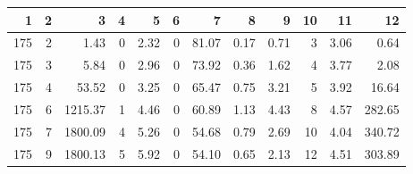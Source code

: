 \begin{tabular}{rrrrrrrrrrrr}
\toprule
1 & 2 & 3 & 4 & 5 & 6 & 7 & 8 & 9 & 10 & 11 & 12 \\
\midrule
175 & 2 & 1.43 & 0 & 2.32 & 0 & 81.07 & 0.17 & 0.71 & 3 & 3.06 & 0.64 \\
175 & 3 & 5.84 & 0 & 2.96 & 0 & 73.92 & 0.36 & 1.62 & 4 & 3.77 & 2.08 \\
175 & 4 & 53.52 & 0 & 3.25 & 0 & 65.47 & 0.75 & 3.21 & 5 & 3.92 & 16.64 \\
175 & 6 & 1215.37 & 1 & 4.46 & 0 & 60.89 & 1.13 & 4.43 & 8 & 4.57 & 282.65 \\
175 & 7 & 1800.09 & 4 & 5.26 & 0 & 54.68 & 0.79 & 2.69 & 10 & 4.04 & 340.72 \\
175 & 9 & 1800.13 & 5 & 5.92 & 0 & 54.10 & 0.65 & 2.13 & 12 & 4.51 & 303.89 \\
\bottomrule
\end{tabular}
